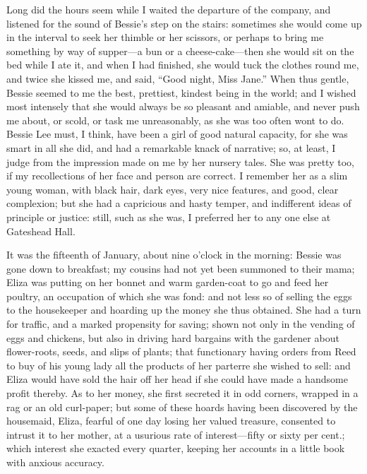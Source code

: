Long did the hours seem while I waited the departure of the company, and
listened for the sound of Bessie's step on the stairs: sometimes she
would come up in the interval to seek her thimble or her scissors, or
perhaps to bring me something by way of supper---a bun or a
cheese-cake---then she would sit on the bed while I ate it, and when I
had finished, she would tuck the clothes round me, and twice she kissed
me, and said, \enquote{Good night, Miss Jane.} When thus gentle, Bessie
seemed to me the best, prettiest, kindest being in the world; and I
wished most intensely that she would always be so pleasant and amiable,
and never push me about, or scold, or task me unreasonably, as she was
too often wont to do. Bessie Lee must, I think, have been a girl of
good natural capacity, for she was smart in all she did, and had a
remarkable knack of narrative; so, at least, I judge from the impression
made on me by her nursery tales. She was pretty too, if my
recollections of her face and person are correct. I remember her as a
slim young woman, with black hair, dark eyes, very nice features, and
good, clear complexion; but she had a capricious and hasty temper, and
indifferent ideas of principle or justice: still, such as she was, I
preferred her to any one else at Gateshead Hall.

It was the fifteenth of January, about nine o'clock in the morning:
Bessie was gone down to breakfast; my cousins had not yet been summoned
to their mama; Eliza was putting on her bonnet and warm garden-coat to
go and feed her poultry, an occupation of which she was fond: and not
less so of selling the eggs to the housekeeper and hoarding up the money
she thus obtained. She had a turn for traffic, and a marked propensity
for saving; shown not only in the vending of eggs and chickens, but also
in driving hard bargains with the gardener about flower-roots, seeds,
and slips of plants; that functionary having orders from \Mrs{} Reed to
buy of his young lady all the products of her parterre she wished to
sell: and Eliza would have sold the hair off her head if she could have
made a handsome profit thereby. As to her money, she first secreted it
in odd corners, wrapped in a rag or an old curl-paper; but some of these
hoards having been discovered by the housemaid, Eliza, fearful of one
day losing her valued treasure, consented to intrust it to her mother,
at a usurious rate of interest---fifty or sixty per cent.; which
interest she exacted every quarter, keeping her accounts in a little
book with anxious accuracy.

